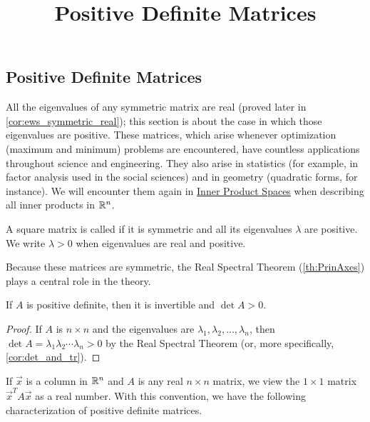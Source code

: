 \documentclass{ximera}
\title{Positive Definite Matrices} \license{CC BY-NC-SA 4.0}
\begin{document}
\begin{abstract}

\end{abstract}
\maketitle

\begin{onlineOnly}
\section*{Positive Definite Matrices}
\end{onlineOnly}

All the eigenvalues of any symmetric
matrix are real (proved later in \ref{cor:ews_symmetric_real}); this section is about the case in which those eigenvalues
 are positive. These matrices, which arise whenever optimization
(maximum and minimum) problems are encountered, have countless
applications throughout science and engineering. They also arise in
statistics (for example, in factor analysis used in the social sciences)
 and in geometry (quadratic forms, for instance). We will encounter them again in \href{https://ximera.osu.edu/oerlinalg/LinearAlgebra/VSP-0070/main}{Inner Product Spaces} when describing all inner products in $\mathbb{R}^n$.


\begin{definition}\label{def:024811}
A square matrix is called  if it is symmetric and all its eigenvalues $\lambda$ are positive.  We write $\lambda>0$ when eigenvalues are real and positive.
\end{definition}

Because these matrices are symmetric, the Real Spectral Theorem (\ref{th:PrinAxes}) plays a central role in the theory.


\begin{theorem}\label{thm:024815}
If $A$ is positive definite, then it is invertible and $\det A > 0$.
\end{theorem}

\begin{proof}
If $A$ is $n \times n$ and the eigenvalues are $\lambda_{1}, \lambda_{2}, \dots, \lambda_{n}$, then $\det A = \lambda_{1}\lambda_{2} \cdots \lambda_{n} > 0$ by the Real Spectral Theorem (or, more specifically, \ref{cor:det_and_tr}).
\end{proof}

If $\vec{x}$ is a column in $\mathbb{R}^n$ and $A$ is any real $n \times n$ matrix, we view the $1 \times 1$ matrix $\vec{x}^{T}A\vec{x}$ as a real number. With this convention, we have the following characterization of positive definite matrices.
\end{document}
